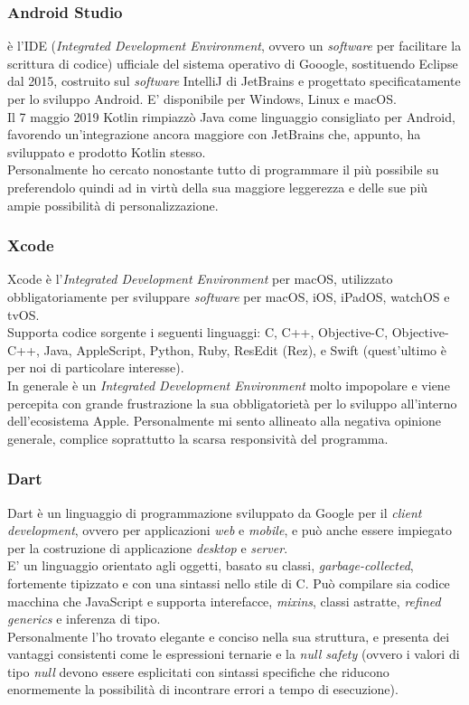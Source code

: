 \subsubsection{Android Studio}
\astudio{} è l'IDE (\textit{Integrated Development Environment}, ovvero un \textit{software} per facilitare la scrittura di codice) ufficiale del sistema operativo di Gooogle, sostituendo Eclipse dal 2015, costruito sul \textit{software} IntelliJ di JetBrains e progettato specificatamente per lo sviluppo Android. E' disponibile per Windows, Linux e macOS.\\
Il 7 maggio 2019 Kotlin rimpiazzò Java come linguaggio consigliato per Android, favorendo un'integrazione ancora maggiore con JetBrains che, appunto, ha sviluppato e prodotto Kotlin stesso.\\
Personalmente ho cercato nonostante tutto di programmare il più possibile su \vsc{} preferendolo quindi ad \astudio{} in virtù della sua maggiore leggerezza e delle sue più ampie possibilità di personalizzazione.

\subsubsection{Xcode}
Xcode è l'\textit{Integrated Development Environment} per macOS, utilizzato obbligatoriamente per sviluppare \textit{software} per macOS, iOS, iPadOS, watchOS e tvOS.\\
Supporta codice sorgente i seguenti linguaggi: C, C++, Objective-C, Objective-C++, Java, AppleScript, Python, Ruby, ResEdit (Rez), e Swift (quest'ultimo è per noi di particolare interesse).\\
In generale è un \textit{Integrated Development Environment} molto impopolare e viene percepita con grande frustrazione la sua obbligatorietà per lo sviluppo all'interno dell'ecosistema Apple. Personalmente mi sento allineato alla negativa opinione generale, complice soprattutto la scarsa responsività del programma.


\subsubsection{Dart}
Dart è un linguaggio di programmazione sviluppato da Google per il \textit{client development}, ovvero per applicazioni \textit{web} e \textit{mobile}, e può anche essere impiegato per la costruzione di applicazione \textit{desktop} e \textit{server}.\\
E' un linguaggio orientato agli oggetti, basato su classi, \textit{garbage-collected}, fortemente tipizzato e con una sintassi nello stile di C. Può compilare sia codice macchina che JavaScript e supporta interefacce, \textit{mixins}, classi astratte, \textit{refined generics} e inferenza di tipo.\\
Personalmente l'ho trovato elegante e conciso nella sua struttura, e presenta dei vantaggi consistenti come le espressioni ternarie e la \textit{null safety} (ovvero i valori di tipo \textit{null} devono essere esplicitati con sintassi specifiche che riducono enormemente la possibilità di incontrare errori a tempo di esecuzione).

